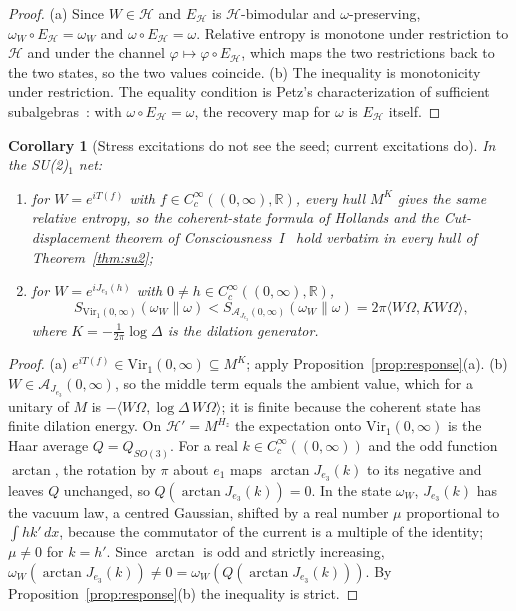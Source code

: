 \documentclass[12pt]{article}
\newtheorem{corollary}[theorem]{Corollary}
\theoremstyle{definition}
\theoremstyle{remark}
\newcommand{\Vir}{\mathrm{Vir}}
\begin{document}
\begin{proof}
(a) Since \(W\in\mathcal H\) and \(E_{\mathcal H}\) is \(\mathcal H\)-bimodular and
\(\omega\)-preserving, \(\omega_W\circ E_{\mathcal H}=\omega_W\) and
\(\omega\circ E_{\mathcal H}=\omega\). Relative entropy is monotone under restriction to
\(\mathcal H\) and under the channel \(\varphi\mapsto\varphi\circ E_{\mathcal H}\), which
maps the two restrictions back to the two states, so the two values coincide.
(b) The inequality is monotonicity under restriction. The equality condition is
Petz's characterization of sufficient subalgebras~\cite{Petz1986,JencovaPetz2006}: with
\(\omega\circ E_{\mathcal H}=\omega\), the recovery map for \(\omega\) is
\(E_{\mathcal H}\) itself.
\end{proof}

\begin{corollary}[Stress excitations do not see the seed; current excitations do]\label{cor:response}
In the SU(2)\(_1\) net:
\begin{enumerate}[label=(\alph*),leftmargin=2em]
\item for \(W=e^{iT(f)}\) with \(f\in C_c^\infty((0,\infty),\mathbb R)\), every hull \(M^K\) gives the same relative entropy, so the
  coherent-state formula of Hollands and the Cut-displacement theorem of
  Consciousness~I~\cite{Hollands,PaperI} hold verbatim in every hull of
  Theorem~\ref{thm:su2};
\item for \(W=e^{iJ_{e_3}(h)}\) with \(0\neq h\in C_c^\infty((0,\infty),\mathbb R)\),
  \[
  S_{\Vir_1(0,\infty)}(\omega_W\|\omega)
  <S_{\mathcal A_{J_{e_3}}(0,\infty)}(\omega_W\|\omega)
  =2\pi\langle W\Omega,KW\Omega\rangle ,
  \]
  where \(K=-\frac1{2\pi}\log\Delta\) is the dilation generator.
\end{enumerate}
\end{corollary}

\begin{proof}
(a) \(e^{iT(f)}\in\Vir_1(0,\infty)\subseteq M^K\); apply
Proposition~\ref{prop:response}(a). (b) \(W\in\mathcal A_{J_{e_3}}(0,\infty)\), so the
middle term equals the ambient value, which for a unitary of \(M\) is
\(-\langle W\Omega,\log\Delta\,W\Omega\rangle\); it is finite because the coherent state
has finite dilation energy. On \(\mathcal H'=M^{H_z}\) the expectation onto
\(\Vir_1(0,\infty)\) is the Haar average \(Q=Q_{SO(3)}\). For a real
\(k\in C_c^\infty((0,\infty))\) and the odd function \(\arctan\), the rotation by \(\pi\)
about \(e_1\) maps \(\arctan J_{e_3}(k)\) to its negative and leaves \(Q\) unchanged,
so \(Q(\arctan J_{e_3}(k))=0\). In the state \(\omega_W\), \(J_{e_3}(k)\) has the vacuum
law, a centred Gaussian, shifted by a real number \(\mu\) proportional to
\(\int hk'\,dx\), because the commutator of the current is a multiple of the identity;
\(\mu\neq0\) for \(k=h'\). Since \(\arctan\) is odd and strictly
increasing, \(\omega_W(\arctan J_{e_3}(k))\neq0=\omega_W(Q(\arctan J_{e_3}(k)))\). By
Proposition~\ref{prop:response}(b) the inequality is strict.
\end{proof}
\end{document}

